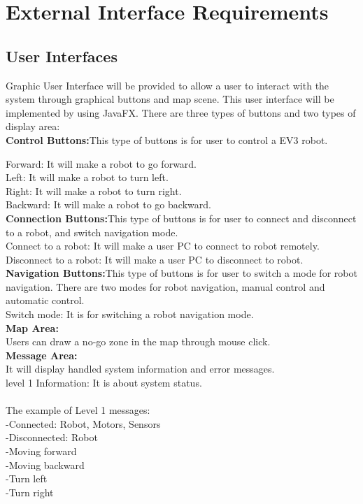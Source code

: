 \documentclass[10pt,a4paper,titlepage]{article}
\begin{document}
	\section{External Interface Requirements}
\subsection{User Interfaces}
Graphic User Interface will be provided to allow a user to interact with the system through graphical buttons and map scene. This user interface will be implemented by using JavaFX. There are three types of buttons and two types of display area:\\

\textbf {Control Buttons:}This type of buttons is for user to control a EV3 robot.

Forward: It will make a robot to go forward.\\
Left: It will make a robot to turn left.\\
Right: It will make a robot to turn right.\\
Backward: It will make a robot to go backward.\\

\textbf {Connection Buttons:}This type of buttons is for user to connect and disconnect to a robot, and switch navigation mode.\\
Connect to a robot: It will make a user PC to connect to robot remotely.\\
Disconnect to a robot: It will make a user PC to disconnect to robot.\\

\textbf {Navigation Buttons:}This type of buttons is for user to switch a mode for robot navigation. There are two modes for robot navigation, manual control and automatic control.\\

Switch mode: It is for switching a robot navigation mode.\\

\textbf{Map Area:}\\
Users can draw a no-go zone in the map through mouse click.\\

\textbf{Message Area:}\\
It will display handled system information and error messages.\\

level 1 Information: It is about system status.\\\\
The example of Level 1 messages:\\
-Connected: Robot, Motors, Sensors\\
-Disconnected: Robot\\
-Moving forward\\
-Moving backward\\
-Turn left\\
-Turn right\\\\
\end{document}
